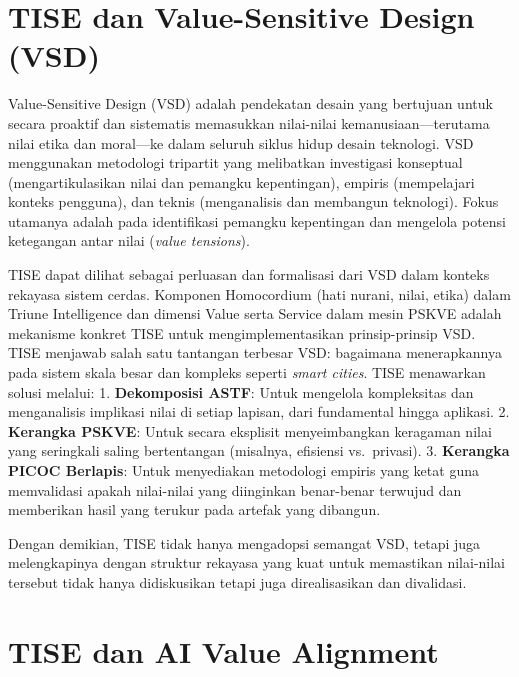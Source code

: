 \documentclass[
  letterpaper,
  DIV=11,
  numbers=noendperiod]{scrreprt}
\begin{document}
\section{\texorpdfstring{\textbf{TISE dan Value-Sensitive Design
(VSD)}}{TISE dan Value-Sensitive Design (VSD)}}\label{tise-dan-value-sensitive-design-vsd}

Value-Sensitive Design (VSD) adalah pendekatan desain yang bertujuan
untuk secara proaktif dan sistematis memasukkan nilai-nilai
kemanusiaan---terutama nilai etika dan moral---ke dalam seluruh siklus
hidup desain teknologi. VSD menggunakan metodologi tripartit yang
melibatkan investigasi konseptual (mengartikulasikan nilai dan pemangku
kepentingan), empiris (mempelajari konteks pengguna), dan teknis
(menganalisis dan membangun teknologi). Fokus utamanya adalah pada
identifikasi pemangku kepentingan dan mengelola potensi ketegangan antar
nilai (\emph{value tensions}).

TISE dapat dilihat sebagai perluasan dan formalisasi dari VSD dalam
konteks rekayasa sistem cerdas. Komponen Homocordium (hati nurani,
nilai, etika) dalam Triune Intelligence dan dimensi Value serta Service
dalam mesin PSKVE adalah mekanisme konkret TISE untuk
mengimplementasikan prinsip-prinsip VSD. TISE menjawab salah satu
tantangan terbesar VSD: bagaimana menerapkannya pada sistem skala besar
dan kompleks seperti \emph{smart cities}. TISE menawarkan solusi
melalui: 1. \textbf{Dekomposisi ASTF}: Untuk mengelola kompleksitas dan
menganalisis implikasi nilai di setiap lapisan, dari fundamental hingga
aplikasi. 2. \textbf{Kerangka PSKVE}: Untuk secara eksplisit
menyeimbangkan keragaman nilai yang seringkali saling bertentangan
(misalnya, efisiensi vs.~privasi). 3. \textbf{Kerangka PICOC Berlapis}:
Untuk menyediakan metodologi empiris yang ketat guna memvalidasi apakah
nilai-nilai yang diinginkan benar-benar terwujud dan memberikan hasil
yang terukur pada artefak yang dibangun.

Dengan demikian, TISE tidak hanya mengadopsi semangat VSD, tetapi juga
melengkapinya dengan struktur rekayasa yang kuat untuk memastikan
nilai-nilai tersebut tidak hanya didiskusikan tetapi juga direalisasikan
dan divalidasi.

\section{\texorpdfstring{\textbf{TISE dan AI Value
Alignment}}{TISE dan AI Value Alignment}}\label{tise-dan-ai-value-alignment}
\end{document}
